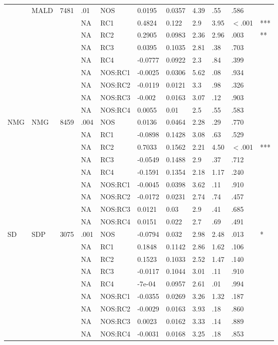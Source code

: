 \begin{table}[ht]
\begin{tabular}{lllllllllll}
   & MALD & 7481 & .01 & NOS & 0.0195 & 0.0357 & 4.39 & .55 & .586 &   \\ 
   &  &  & NA & RC1 & 0.4824 & 0.122 & 2.9 & 3.95 & $<$.001 & *** \\ 
   &  &  & NA & RC2 & 0.2905 & 0.0983 & 2.36 & 2.96 & .003 & ** \\ 
   &  &  & NA & RC3 & 0.0395 & 0.1035 & 2.81 & .38 & .703 &   \\ 
   &  &  & NA & RC4 & -0.0777 & 0.0922 & 2.3 & .84 & .399 &   \\ 
   &  &  & NA & NOS:RC1 & -0.0025 & 0.0306 & 5.62 & .08 & .934 &   \\ 
   &  &  & NA & NOS:RC2 & -0.0119 & 0.0121 & 3.3 & .98 & .326 &   \\ 
   &  &  & NA & NOS:RC3 & -0.002 & 0.0163 & 3.07 & .12 & .903 &   \\ 
   &  &  & NA & NOS:RC4 & 0.0055 & 0.01 & 2.5 & .55 & .583 &   \\ 
  NMG & NMG & 8459 & .004 & NOS & 0.0136 & 0.0464 & 2.28 & .29 & .770 &   \\ 
   &  &  & NA & RC1 & -0.0898 & 0.1428 & 3.08 & .63 & .529 &   \\ 
   &  &  & NA & RC2 & 0.7033 & 0.1562 & 2.21 & 4.50 & $<$.001 & *** \\ 
   &  &  & NA & RC3 & -0.0549 & 0.1488 & 2.9 & .37 & .712 &   \\ 
   &  &  & NA & RC4 & -0.1591 & 0.1354 & 2.18 & 1.17 & .240 &   \\ 
   &  &  & NA & NOS:RC1 & -0.0045 & 0.0398 & 3.62 & .11 & .910 &   \\ 
   &  &  & NA & NOS:RC2 & -0.0172 & 0.0231 & 2.74 & .74 & .457 &   \\ 
   &  &  & NA & NOS:RC3 & 0.0121 & 0.03 & 2.9 & .41 & .685 &   \\ 
   &  &  & NA & NOS:RC4 & 0.0151 & 0.022 & 2.7 & .69 & .491 &   \\ 
  SD & SDP & 3075 & .001 & NOS & -0.0794 & 0.032 & 2.98 & 2.48 & .013 & * \\ 
   &  &  & NA & RC1 & 0.1848 & 0.1142 & 2.86 & 1.62 & .106 &   \\ 
   &  &  & NA & RC2 & 0.1523 & 0.1033 & 2.52 & 1.47 & .140 &   \\ 
   &  &  & NA & RC3 & -0.0117 & 0.1044 & 3.01 & .11 & .910 &   \\ 
   &  &  & NA & RC4 & -7e-04 & 0.0957 & 2.61 & .01 & .994 &   \\ 
   &  &  & NA & NOS:RC1 & -0.0355 & 0.0269 & 3.26 & 1.32 & .187 &   \\ 
   &  &  & NA & NOS:RC2 & -0.0029 & 0.0163 & 3.93 & .18 & .860 &   \\ 
   &  &  & NA & NOS:RC3 & 0.0023 & 0.0162 & 3.33 & .14 & .889 &   \\ 
   &  &  & NA & NOS:RC4 & -0.0031 & 0.0168 & 3.25 & .18 & .853 &   \\ 
   \hline
\end{tabular}
\endgroup
\end{table}
